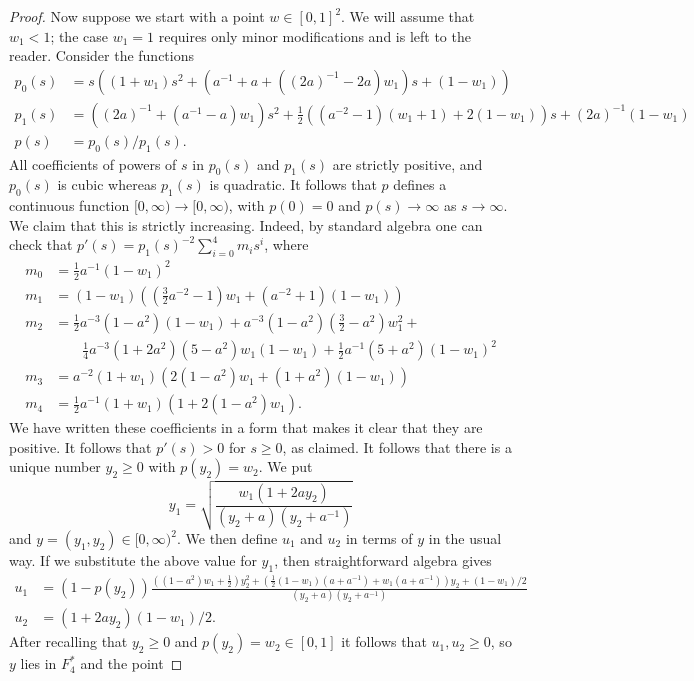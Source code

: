 \documentclass[reqno]{amsart}
\newcommand{\half}      {\tfrac{1}{2}}
\renewcommand{\:}{\colon}
\theoremstyle{definition}
\begin{document}
\begin{proof}
 Now suppose we start with a point $w\in[0,1]^2$.  We will assume that
 $w_1<1$; the case $w_1=1$ requires only minor modifications and is
 left to the reader.  Consider the functions
 \begin{align*}
  p_0(s) &= s((1+w_1)s^2+(a^{-1}+a+((2a)^{-1}-2a)w_1)s+(1-w_1)) \\
  p_1(s) &= ((2a)^{-1}+(a^{-1}-a)w_1)s^2+
             \half((a^{-2}-1)(w_1+1)+2(1-w_1))s+(2a)^{-1}(1-w_1) \\
  p(s) &= p_0(s)/p_1(s).
 \end{align*}
 All coefficients of powers of $s$ in $p_0(s)$ and $p_1(s)$
 are strictly positive, and $p_0(s)$ is cubic whereas $p_1(s)$ is
 quadratic.  It follows that $p$ defines a continuous function
 $[0,\infty)\to[0,\infty)$, with $p(0)=0$ and $p(s)\to\infty$ as
 $s\to\infty$.  We claim that this is strictly increasing.  Indeed, by
 standard algebra one can check that
 $p'(s)=p_1(s)^{-2}\sum_{i=0}^4m_is^i$, where
 \begin{align*}
  m_0 &= \half a^{-1}(1-w_1)^2 \\
  m_1 &= (1-w_1)((\tfrac{3}{2}a^{-2}-1)w_1+(a^{-2}+1)(1-w_1)) \\
  m_2 &= \half a^{-3}(1-a^2)(1-w_1) +
         a^{-3}(1-a^2)(\tfrac{3}{2}-a^2)w_1^2 + \\ & \qquad
         \tfrac{1}{4}a^{-3}(1+2a^2)(5-a^2)w_1(1-w_1) +
         \half a^{-1}(5+a^2)(1-w_1)^2 \\
  m_3 &= a^{-2}(1+w_1)(2(1-a^2)w_1+(1+a^2)(1-w_1)) \\
  m_4 &= \half a^{-1}(1+w_1)(1+2(1-a^2)w_1).
 \end{align*}
 We have written these coefficients in a form that makes it clear that
 they are positive.  It follows that $p'(s)>0$ for $s\geq 0$, as
 claimed.  It follows that there is a unique number $y_2\geq 0$ with
 $p(y_2)=w_2$.  We put
 \[ y_1 = \sqrt{\frac{w_1(1+2ay_2)}{(y_2+a)(y_2+a^{-1})}} \]
 and $y=(y_1,y_2)\in [0,\infty)^2$.  We then define $u_1$ and $u_2$ in
 terms of $y$ in the usual way.  If we substitute the above value for
 $y_1$, then straightforward algebra gives
 \begin{align*}
  u_1 &= (1-p(y_2))
         \frac{((1-a^2)w_1+\half)y_2^2+(\half(1-w_1)(a+a^{-1})+w_1(a+a^{-1}))y_2+(1-w_1)/2}{(y_2+a)(y_2+a^{-1})} \\
  u_2 &= (1+2ay_2)(1-w_1)/2.
 \end{align*}
 After recalling that $y_2\geq 0$ and $p(y_2)=w_2\in [0,1]$ it follows that
 $u_1,u_2\geq 0$, so $y$ lies in $F_4^*$ and the point

\end{proof}
\end{document}
